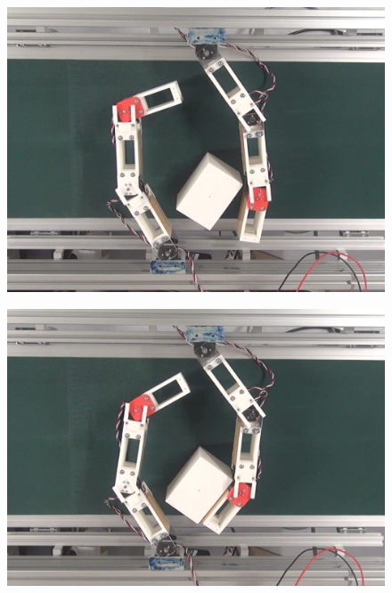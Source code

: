 \documentclass[a4paper,twoside,12pt,papersize, dvipdfmx]{iirthesis}
\begin{document}
\begin{figure}[hbt]
\centering
\begin{minipage}{0.249\hsize}
\centering
\includegraphics[width=0.98\hsize]{fig/4-manipulation-result/Rectangle/2-1.jpg}
\subcaption{}\label{}
\end{minipage}\hfill
\begin{minipage}{0.249\hsize}
\centering
\includegraphics[width=0.98\hsize]{fig/4-manipulation-result/Rectangle/2-2.jpg}
\subcaption{}\label{}
\end{minipage}\hfill
\begin{minipage}{0.249\hsize}
\centering

\end{minipage}
\end{figure}
\end{document}
